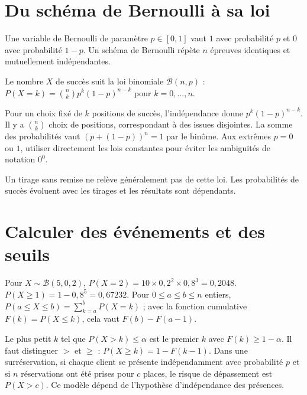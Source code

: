\documentclass[../cours_tle.tex]{subfiles}
\begin{document}
\section{Du schéma de Bernoulli à sa loi}
Une variable de Bernoulli de paramètre $p\in[0,1]$ vaut $1$ avec probabilité $p$ et $0$ avec probabilité $1-p$.
Un schéma de Bernoulli répète $n$ épreuves identiques et mutuellement indépendantes.
\begin{theoreme}
Le nombre $X$ de succès suit la loi binomiale $\mathcal B(n,p)$ :
$P(X=k)=\binom nk p^k(1-p)^{n-k}$ pour $k=0,\ldots,n$.
\end{theoreme}
\begin{demonstration}
Pour un choix fixé de $k$ positions de succès, l'indépendance donne $p^k(1-p)^{n-k}$. Il y a $\binom nk$ choix de positions, correspondant à des issues disjointes.
La somme des probabilités vaut $(p+(1-p))^n=1$ par le binôme.
Aux extrêmes $p=0$ ou $1$, utiliser directement les lois constantes pour éviter les ambiguïtés de notation $0^0$.
\end{demonstration}
Un tirage sans remise ne relève généralement pas de cette loi. Les probabilités de succès évoluent avec les tirages et les résultats sont dépendants.
\section{Calculer des événements et des seuils}
Pour $X\sim\mathcal B(5,0{,}2)$, $P(X=2)=10\times0{,}2^2\times0{,}8^3=0{,}2048$.
$P(X\ge1)=1-0{,}8^5=0{,}67232$.
Pour $0\le a\le b\le n$ entiers,
$P(a\le X\le b)=\sum_{k=a}^bP(X=k)$ ; avec la fonction cumulative $F(k)=P(X\le k)$, cela vaut $F(b)-F(a-1)$.

Le plus petit $k$ tel que $P(X>k)\le\alpha$ est le premier $k$ avec $F(k)\ge1-\alpha$. Il faut distinguer $>$ et $\ge$ : $P(X\ge k)=1-F(k-1)$.
Dans une surréservation, si chaque client se présente indépendamment avec probabilité $p$ et si $n$ réservations ont été prises pour $c$ places, le risque de dépassement est $P(X>c)$. Ce modèle dépend de l'hypothèse d'indépendance des présences.
\end{document}
